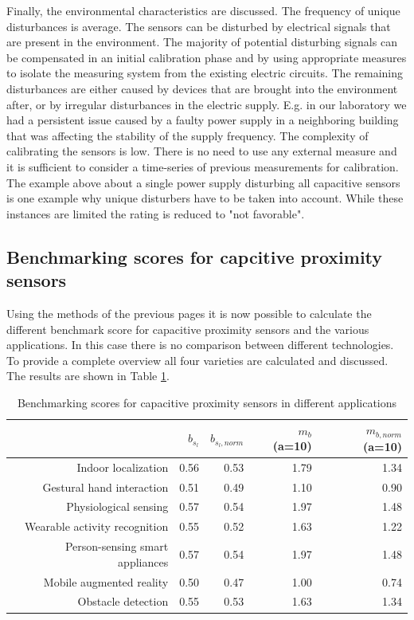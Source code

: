 Finally, the environmental characteristics are discussed. The frequency of unique disturbances is average. The sensors can be disturbed by electrical signals that are present in the environment. The majority of potential disturbing signals can be compensated in an initial calibration phase and by using appropriate measures to isolate the measuring system from the existing electric circuits. The remaining disturbances are either caused by devices that are brought into the environment after, or by irregular disturbances in the electric supply. E.g. in our laboratory we had a persistent issue caused by a faulty power supply in a neighboring building that was affecting the stability of the supply frequency. The complexity of calibrating the sensors is low. There is no need to use any external measure and it is sufficient to consider a time-series of previous measurements for calibration. The example above about a single power supply disturbing all capacitive sensors is one example why unique disturbers have to be taken into account. While these instances are limited the rating is reduced to "not favorable".


\subsection{Benchmarking scores for capcitive proximity sensors}

Using the methods of the previous pages it is now possible to calculate the different benchmark score for capacitive proximity sensors and the various applications. In this case there is no comparison between different technologies. To provide a complete overview all four varieties are calculated and discussed. The results are shown in Table \ref{tab:bench_capapps_scores}. 

\begin{table}[htbp]
  \centering
  \caption{Benchmarking scores for capacitive proximity sensors in different applications}
   \begin{tabular}{rrrrr}
    \toprule
          & $b_{s_l}$ & $b_{s_l,norm}$ & $m_b$ (a=10) & $m_{b,norm}$ (a=10) \\
    \midrule
    Indoor localization & 0.56  & 0.53  & 1.79  & 1.34 \\
    Gestural hand interaction & 0.51  & 0.49  & 1.10  & 0.90 \\
    Physiological sensing & 0.57  & 0.54  & 1.97  & 1.48 \\
    Wearable activity recognition & 0.55  & 0.52  & 1.63  & 1.22 \\
    Person-sensing smart appliances & 0.57  & 0.54  & 1.97  & 1.48 \\
    Mobile augmented reality & 0.50  & 0.47  & 1.00  & 0.74 \\
    Obstacle detection & 0.55  & 0.53  & 1.63  & 1.34 \\

    \bottomrule
    \end{tabular}%
  \label{tab:bench_capapps_scores}%
\end{table}%

